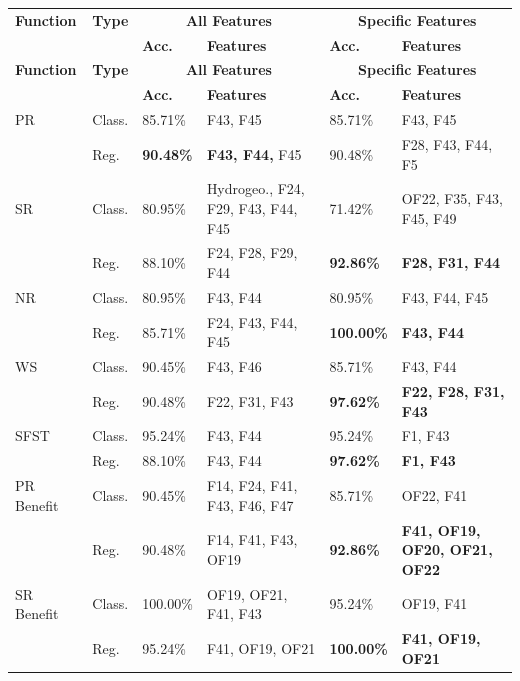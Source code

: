 \documentclass[12pt,letterpaper]{article}
\begin{document}
\begin{longtable}{|p{2cm}|p{1.5cm}|p{1.5cm}|p{3.5cm}|p{1.5cm}|p{3.5cm}|}
\hline
\textbf{Function} & \textbf{Type} & \multicolumn{2}{c|}{\textbf{All Features}} & \multicolumn{2}{c|}{\textbf{Specific Features}} \\
\cline{3-6}
 & & \textbf{Acc.} & \textbf{Features} & \textbf{Acc.} & \textbf{Features} \\
\hline
\endfirsthead

\hline
\textbf{Function} & \textbf{Type} & \multicolumn{2}{c|}{\textbf{All Features}} & \multicolumn{2}{c|}{\textbf{Specific Features}} \\
\cline{3-6}
 & & \textbf{Acc.} & \textbf{Features} & \textbf{Acc.} & \textbf{Features} \\
\hline
\endhead

PR & Class. & 85.71\% & F43, F45 & 85.71\% & F43, F45 \\
\cline{2-6}
 & Reg. & \textbf{90.48\%} & \textbf{F43, F44,} F45 & 90.48\% & F28, F43, F44, F5 \\
\hline
SR & Class. & 80.95\% & Hydrogeo., F24, F29, F43, F44, F45 & 71.42\% & OF22, F35, F43, F45, F49 \\
\cline{2-6}
 & Reg. & 88.10\% & F24, F28, F29, F44 & \textbf{92.86\%} & \textbf{F28, F31, F44} \\
\hline
NR & Class. & 80.95\% & F43, F44 & 80.95\% & F43, F44, F45 \\
\cline{2-6}
 & Reg. & 85.71\% & F24, F43, F44, F45 & \textbf{100.00\%} & \textbf{F43, F44} \\
\hline
WS & Class. & 90.45\% & F43, F46 & 85.71\% & F43, F44 \\
\cline{2-6}
 & Reg. & 90.48\% & F22, F31, F43 & \textbf{97.62\%} &\textbf{ F22, F28, F31, F43} \\
\hline
SFST & Class. & 95.24\% & F43, F44 & 95.24\% & F1, F43 \\
\cline{2-6}
 & Reg. & 88.10\% & F43, F44 &\textbf{ 97.62\%} & \textbf{F1, F43} \\
\hline
PR Benefit & Class. & 90.45\% & F14, F24, F41, F43, F46, F47 & 85.71\% & OF22, F41 \\
\cline{2-6}
 & Reg. & 90.48\% & F14, F41, F43, OF19 & \textbf{92.86\%} & \textbf{F41, OF19, OF20, OF21, OF22 }\\
\hline
SR Benefit & Class. & 100.00\% & OF19, OF21, F41, F43 & 95.24\% & OF19, F41 \\
\cline{2-6}
 & Reg. & 95.24\% & F41, OF19, OF21 & \textbf{100.00\%} & \textbf{F41, OF19, OF21} \\

\end{longtable}
\end{document}
